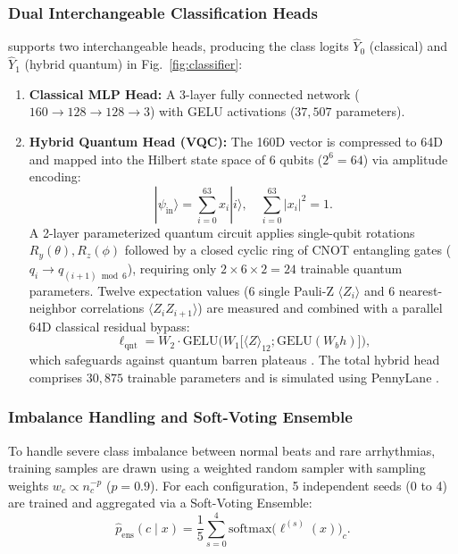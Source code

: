 \subsubsection{Dual Interchangeable Classification Heads}
\RRN{} supports two interchangeable heads, producing the class logits $\hat{Y}_0$ (classical) and $\hat{Y}_1$ (hybrid quantum) in Fig.~\ref{fig:classifier}:
\begin{enumerate}
    \item \textbf{Classical MLP Head:} A 3-layer fully connected network ($160 \to 128 \to 128 \to 3$) with GELU activations ($37{,}507$ parameters).
    \item \textbf{Hybrid Quantum Head (VQC):} The 160D vector is compressed to 64D and mapped into the Hilbert state space of 6 qubits ($2^6 = 64$) via amplitude encoding:
    \begin{equation}
    |\psi_{\mathrm{in}}\rangle = \sum_{i=0}^{63} x_i |i\rangle, \quad \sum_{i=0}^{63} |x_i|^2 = 1.
    \end{equation}
    A 2-layer parameterized quantum circuit applies single-qubit rotations $R_y(\theta), R_z(\phi)$ followed by a closed cyclic ring of CNOT entangling gates ($q_i \to q_{(i+1)\bmod 6}$), requiring only $2 \times 6 \times 2 = 24$ trainable quantum parameters. Twelve expectation values (6 single Pauli-Z $\langle Z_i \rangle$ and 6 nearest-neighbor correlations $\langle Z_i Z_{i+1} \rangle$) are measured and combined with a parallel 64D classical residual bypass:
    \begin{equation}
    \ell_{\mathrm{qnt}} = W_2 \cdot \mathrm{GELU}\Big(W_1 \big[\langle Z \rangle_{12}; \mathrm{GELU}(W_b h)\big]\Big),
    \end{equation}
    which safeguards against quantum barren plateaus \cite{mcclean2018}. The total hybrid head comprises $30{,}875$ trainable parameters and is simulated using PennyLane \cite{pennylane2018}.
\end{enumerate}

\subsubsection{Imbalance Handling and Soft-Voting Ensemble}
To handle severe class imbalance between normal beats and rare arrhythmias, training samples are drawn using a weighted random sampler with sampling weights $w_c \propto n_c^{-p}$ ($p=0.9$). For each configuration, 5 independent seeds (0 to 4) are trained and aggregated via a Soft-Voting Ensemble:
\begin{equation}
\hat{p}_{\mathrm{ens}}(c \mid x) = \frac{1}{5}\sum_{s=0}^4 \mathrm{softmax}\big(\ell^{(s)}(x)\big)_c.
\end{equation}
